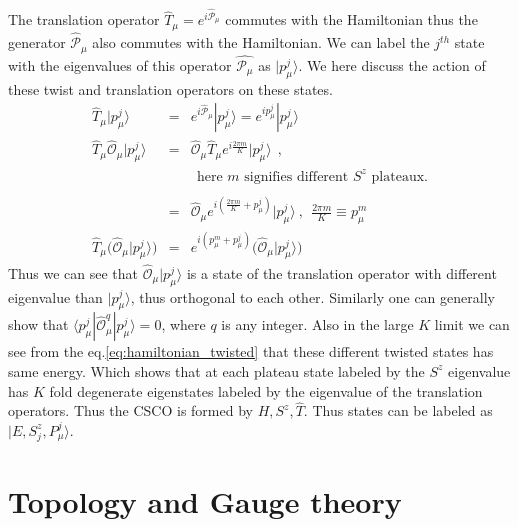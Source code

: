 \documentclass[reprint,prb,superscriptaddress]{revtex4-2}
\begin{document}
\noindent The translation operator $\hat{T}_{\mu}=e^{i\hat{\mathcal{P}}_{\mu}}$ commutes with the Hamiltonian thus the generator $\hat{\mathcal{P}}_{\mu}$ also commutes with the Hamiltonian. We can label the $j^{th}$ state with the eigenvalues of this operator $\hat{\mathcal{P}_{\mu}}$ as $|p^{j}_{\mu}\rangle$. We here discuss the action of these twist and translation operators on these states.
\begin{eqnarray}
\hat{T}_{\mu} |p^j_{\mu} \rangle &=& e^{i\hat{\mathcal{P}}_{\mu}} |p^j_{\mu} \rangle = e^{ip^j_{\mu}} |p^j_{\mu}\rangle \nonumber\\
\hat{T}_{\mu} \hat{\mathcal{O}}_{\mu} |p^j_{\mu} \rangle &=&  \hat{\mathcal{O}}_{\mu} \hat{T}_{\mu} e^{i\frac{2\pi m}{K}} |p^j_{\mu}\rangle~~, \nonumber\\
&&~~\textrm{here $m$ signifies different $S^z$ plateaux.} \nonumber\\ \nonumber\\
&=& \hat{\mathcal{O}}_{\mu}   e^{i(\frac{2\pi m}{K}+p_{\mu}^j)} |p^j_{\mu}\rangle~,~~ \frac{2\pi m}{K} \equiv p_{\mu}^{m} \nonumber\\
\hat{T}_{\mu} \bigg( \hat{\mathcal{O}}_{\mu} |p^j_{\mu} \rangle  \bigg) &=& e^{i(p_{\mu}^{m}+p_{\mu}^j)} \bigg( \hat{\mathcal{O}}_{\mu}    |p^j_{\mu}\rangle \bigg)    
\end{eqnarray}
Thus we can see that  $\hat{\mathcal{O}}_{\mu} |p^j_{\mu} \rangle $ is a state of the translation operator with different eigenvalue than $|p^j_{\mu} \rangle $, thus orthogonal to each other. Similarly one can generally show that $\langle p^j_{\mu} | \hat{\mathcal{O}}^{q}_{\mu} |p^j_{\mu} \rangle=0$, where $q$ is any integer. Also in the large $K$ limit we can see from the eq.\eqref{eq:hamiltonian_twisted} that these different twisted states has same energy. Which shows that at each plateau state labeled by the $S^z$ eigenvalue has $K$ fold degenerate eigenstates labeled by the eigenvalue of the translation operators. Thus the CSCO is formed by $H,S^z,\hat{T}$. Thus states can be labeled as  $|E,S^z_j,P^j_{\mu}\rangle$. 

\section{Topology and Gauge theory}
\end{document}
